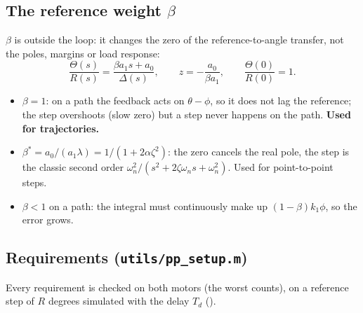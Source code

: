 \documentclass[10pt,a4paper]{article}
\newcommand{\code}[1]{\texttt{\detokenize{#1}}}
\begin{document}
\subsection{The reference weight $\beta$}\label{sec:beta}
$\beta$ is outside the loop: it changes the zero of the reference-to-angle transfer, not the poles, margins or load response:
\begin{equation}
  \frac{\Theta(s)}{R(s)}=\frac{\beta a_1 s+a_0}{\Delta(s)},\qquad z=-\frac{a_0}{\beta a_1},\qquad \frac{\Theta(0)}{R(0)}=1 .
\end{equation}
\begin{itemize}
  \item $\beta=1$: on a path the feedback acts on $\theta-\phi$, so it does not lag the reference; the step overshoots
        (slow zero) but a step never happens on the path. \textbf{Used for trajectories.}
  \item $\beta^*=a_0/(a_1\lambda)=1/(1+2\alpha\zeta^2)$: the zero cancels the real pole, the step is the classic second
        order $\omega_n^2/(s^2+2\zeta\omega_n s+\omega_n^2)$. Used for point-to-point steps.
  \item $\beta<1$ on a path: the integral must continuously make up $(1-\beta)k_1\phi$, so the error grows.
\end{itemize}

\subsection{Requirements (\texttt{utils/pp\_setup.m})}\label{sec:req}
Every requirement is checked on both motors (the worst counts), on a reference step of $R$ degrees simulated with the
delay $T_d$ (\code{closed_loop.m}).
\end{document}
